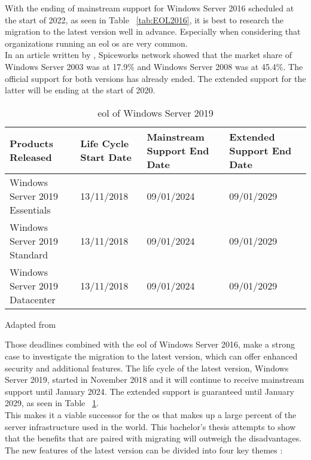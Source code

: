 With the ending of mainstream support for Windows Server 2016 scheduled at the start of 2022, as seen in Table ~\ref{tab:EOL2016}, it is best to research the migration to the latest version well in advance. 
Especially when considering that organizations running an \acrfull{eol} \acrshort{os} are very common. \\
In an article written by \textcite{Tsai2016}, Spiceworks network showed that the market share of Windows Server 2003 was at 17.9\% and Windows Server 2008 was at 45.4\%. 
The official support for both versions has already ended. The extended support for the latter will be ending at the start of 2020. 

\begin{table}[ht]
	\centering
	\begin{adjustbox}{width=1\textwidth}
		\begin{tabular}{l|l|l|ll}
			Products Released & Life Cycle Start Date & Mainstream Support End Date & Extended Support End Date &\\
			\hline
			Windows Server 2019 Essentials & 13/11/2018 & 09/01/2024 & 09/01/2029 &\\
			Windows Server 2019 Standard & 13/11/2018 & 09/01/2024 & 09/01/2029 &\\
			Windows Server 2019 Datacenter & 13/11/2018 & 09/01/2024 & 09/01/2029 &\\
		\end{tabular}
	\end{adjustbox}
	\caption[\acrshort{eol} \acrshort{ws}2019]{\acrshort{eol} of Windows Server 2019}
	\scriptsize	
	Adapted from \cite{MicrosoftEOL2019}
	\label{tab:EOL2019}
\end{table}

Those deadlines combined with the \acrshort{eol} of Windows Server 2016, make a strong case to investigate the migration to the latest version, which can offer enhanced security and additional features. 
The life cycle of the latest version, Windows Server 2019, started in November 2018 and it will continue to receive mainstream support until January 2024. 
The extended support is guaranteed until January 2029, as seen in Table ~\ref{tab:EOL2019}.\\
This makes it a viable successor for the \acrshort{os} that makes up a large percent of the server infrastructure used in the world. 
This bachelor's thesis attempts to show that the benefits that are paired with migrating will outweigh the disadvantages. 
The new features of the latest version can be divided into four key themes \autocite{MWST2018}:

